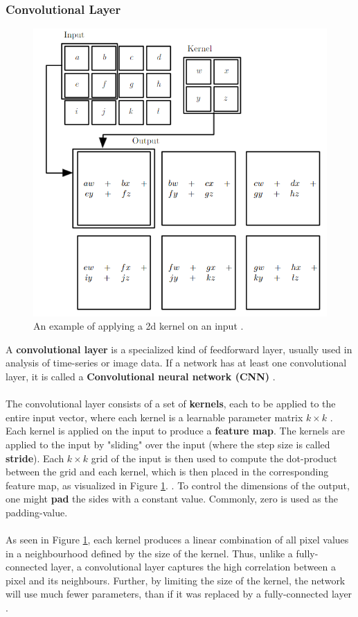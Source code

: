 \documentclass[./main.tex]{subfiles}
\begin{document}
\subsubsection{Convolutional Layer}
\begin{figure}[htbp]
    \centering
    \includegraphics[width = 0.5 \textwidth]{./entities/2d_conv_example.PNG}
    \caption{An example of applying a 2d kernel on an input \cite{DL_book}.}
    \label{fig:2d_conv_example}
\end{figure}
\noindent A \textbf{convolutional layer} is a specialized kind of feedforward layer, usually used in analysis of time-series or image data. If a network has at least one convolutional layer, it is called a \textbf{Convolutional neural network (CNN)} \cite{DL_book}.
\\
\\
\noindent The convolutional layer consists of a set of \textbf{kernels}, each to be applied to the entire input vector, where each kernel is a learnable parameter matrix $k \times k$ \cite{everything}. Each kernel is applied on the input to produce a \textbf{feature map}. The kernels are applied to the input by "sliding" over the input (where the step size is called \textbf{stride}). Each $k \times k$ grid of the input is then used to compute the dot-product between the grid and each kernel, which is then placed in the corresponding feature map, as visualized in Figure \ref{fig:2d_conv_example}. \cite{bsc_thesis}. To control the dimensions of the output, one might \textbf{pad} the sides with a constant value. Commonly, zero is used as the padding-value.
\\
\\
As seen in Figure \ref{fig:2d_conv_example}, each kernel produces a linear combination of all pixel values in a neighbourhood defined by the size of the kernel. Thus, unlike a fully-connected layer, a convolutional layer captures the high correlation between a pixel and its neighbours. Further, by limiting the size of the kernel, the network will use much fewer parameters, than if it was replaced by a fully-connected layer \cite{DL_book}.
\end{document}
